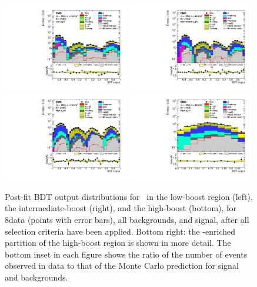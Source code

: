 \documentclass[11pt,twoside,a4paper,cmspaper,final,collab]{cms-tdr}
\begin{document}
\begin{figure}[htbp]
\centering
    \includegraphics[width=0.49\textwidth]{BDT_Znn_LowPt_ZnunuLowPt_8TeV_PostFit_s}
    \includegraphics[width=0.49\textwidth]{BDT_Znn_MedPt_ZnunuMedPt_8TeV_PostFit_s}
    \includegraphics[width=0.49\textwidth]{BDT_Znn_HighPt_ZnunuHighPt_8TeV_PostFit_s}
    \includegraphics[width=0.49\textwidth]{BDT_Znn_HighPt_Last_ZnunuHighPt_8TeV_PostFit_s}
    \caption{Post-fit BDT output distributions for \ZnnH\ in the low-boost region (left),
    the intermediate-boost (right), and the high-boost  (bottom), for 8\TeV data
    (points with error bars), all
    backgrounds, and signal, after all selection criteria have been
    applied.  Bottom right: the \VH-enriched partition of the high-boost region
    is shown in more detail. The bottom inset in each
      figure shows the ratio of the number of events observed in data to that
      of the Monte Carlo prediction for signal and backgrounds.}
    \label{fig:BDTZnn8TeV}
\end{figure}
\end{document}
